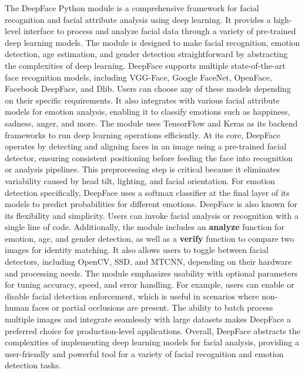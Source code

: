 \vspace{1em}
\noindent
The DeepFace Python module is a comprehensive framework for facial recognition and facial attribute analysis using deep learning. It provides a high-level interface to process and analyze facial data through a variety of pre-trained deep learning models. The module is designed to make facial recognition, emotion detection, age estimation, and gender detection straightforward by abstracting the complexities of deep learning. DeepFace supports multiple state-of-the-art face recognition models, including VGG-Face, Google FaceNet, OpenFace, Facebook DeepFace, and Dlib. Users can choose any of these models depending on their specific requirements. It also integrates with various facial attribute models for emotion analysis, enabling it to classify emotions such as happiness, sadness, anger, and more. The module uses TensorFlow and Keras as its backend frameworks to run deep learning operations efficiently. At its core, DeepFace operates by detecting and aligning faces in an image using a pre-trained facial detector, ensuring consistent positioning before feeding the face into recognition or analysis pipelines. This preprocessing step is critical because it eliminates variability caused by head tilt, lighting, and facial orientation. For emotion detection specifically, DeepFace uses a softmax classifier at the final layer of its models to predict probabilities for different emotions. DeepFace is also known for its flexibility and simplicity. Users can invoke facial analysis or recognition with a single line of code. Additionally, the module includes an \textbf{analyze} function for emotion, age, and gender detection, as well as a \textbf{verify} function to compare two images for identity matching. It also allows users to toggle between facial detectors, including OpenCV, SSD, and MTCNN, depending on their hardware and processing needs. The module emphasizes usability with optional parameters for tuning accuracy, speed, and error handling. For example, users can enable or disable facial detection enforcement, which is useful in scenarios where non-human faces or partial occlusions are present. The ability to batch process multiple images and integrate seamlessly with large datasets makes DeepFace a preferred choice for production-level applications. Overall, DeepFace abstracts the complexities of implementing deep learning models for facial analysis, providing a user-friendly and powerful tool for a variety of facial recognition and emotion detection tasks.


